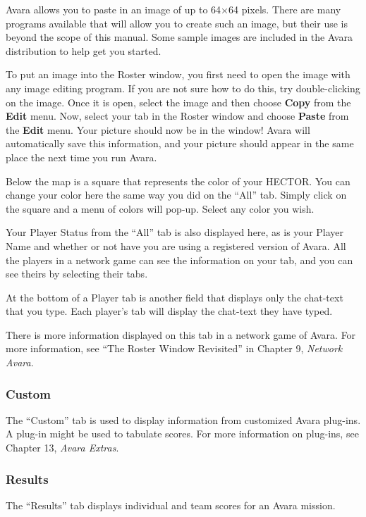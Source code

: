 \documentclass{article}
\begin{document}
Avara allows you to paste in an image of up to 64$\times$64 pixels. There are many programs available that will allow you to create such an image, but their use is beyond the scope of this manual. Some sample images are included in the Avara distribution to help get you started.

To put an image into the Roster window, you first need to open the image with any image editing program. If you are not sure how to do this, try double-clicking on the image. Once it is open, select the image and then choose \textbf{Copy} from the \textbf{Edit} menu. Now, select your tab in the Roster window and choose \textbf{Paste} from the \textbf{Edit} menu. Your picture should now be in the window! Avara will automatically save this information, and your picture should appear in the same place the next time you run Avara.

Below the map is a square that represents the color of your HECTOR. You can change your color here the same way you did on the ``All'' tab. Simply click on the square and a menu of colors will pop-up. Select any color you wish.

Your Player Status from the ``All'' tab is also displayed here, as is your Player Name and whether or not have you are using a registered version of Avara. All the players in a network game can see the information on your tab, and you can see theirs by selecting their tabs.

At the bottom of a Player tab is another field that displays only the chat-text that you type. Each player's tab will display the chat-text they have typed.

There is more information displayed on this tab in a network game of Avara. For more information, see ``The Roster Window Revisited'' in Chapter 9, \textit{Network Avara}.

\subsubsection{Custom}
The ``Custom'' tab is used to display information from customized Avara plug-ins. A plug-in might be used to tabulate scores. For more information on plug-ins, see Chapter 13, \textit{Avara Extras}.

\subsubsection{Results}
The ``Results'' tab displays individual and team scores for an Avara mission.
\end{document}
